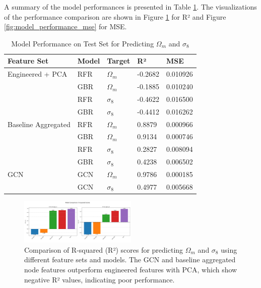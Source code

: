 \documentclass[twocolumn]{aastex631}
\begin{document}
A summary of the model performances is presented in Table \ref{tab:model_performance}. The visualizations of the performance comparison are shown in Figure \ref{fig:model_performance_r2} for R² and Figure \ref{fig:model_performance_mse} for MSE.

\begin{table}[h!]
\centering
\caption{Model Performance on Test Set for Predicting $\Omega_m$ and $\sigma_8$}
\begin{tabular}{|l|l|l|l|l|}
\hline
Feature Set             & Model & Target    & R²      & MSE        \\ \hline
Engineered + PCA    & RFR   & $\Omega_m$  & -0.2682 & 0.010926   \\ \hline
                        & GBR   & $\Omega_m$  & -0.1885 & 0.010240   \\ \hline
                        & RFR   & $\sigma_8$  & -0.4622 & 0.016500   \\ \hline
                        & GBR   & $\sigma_8$  & -0.4412 & 0.016262   \\ \hline
Baseline Aggregated & RFR   & $\Omega_m$  & 0.8879  & 0.000966   \\ \hline
                        & GBR   & $\Omega_m$  & 0.9134  & 0.000746   \\ \hline
                        & RFR   & $\sigma_8$  & 0.2827  & 0.008094   \\ \hline
                        & GBR   & $\sigma_8$  & 0.4238  & 0.006502   \\ \hline
GCN                     & GCN   & $\Omega_m$  & 0.9786  & 0.000185   \\ \hline
                        & GCN   & $\sigma_8$  & 0.4977  & 0.005668   \\ \hline
\end{tabular}
\label{tab:model_performance}
\end{table}

\begin{figure}[h!]
    \centering
    \includegraphics[width=0.5\textwidth]{../input_files/plots/model_performance_r2_11_20250527-135752.png}
    \caption{Comparison of R-squared (R²) scores for predicting $\Omega_m$ and $\sigma_8$ using different feature sets and models. The GCN and baseline aggregated node features outperform engineered features with PCA, which show negative R² values, indicating poor performance.}
    \label{fig:model_performance_r2}
\end{figure}
\end{document}
